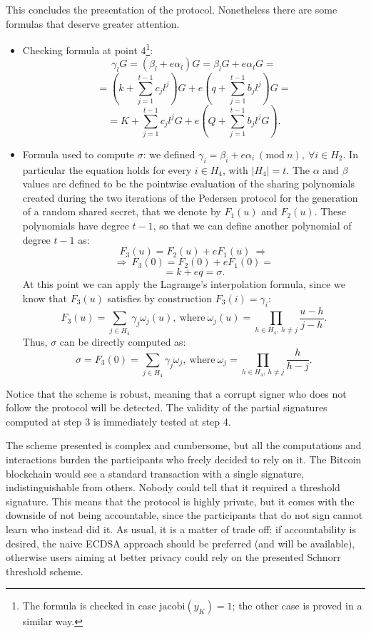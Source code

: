 This concludes the presentation of the protocol. Nonetheless there are some formulas that deserve greater attention.
\begin{itemize}
	\item Checking formula at point 4\footnote{The formula is checked in case $\text{jacobi}(y_K) = 1$; the other case is proved in a similar way.}: 
	$$\gamma_lG = (\beta_l + e\alpha_l)G = \beta_lG + e\alpha_lG = $$
	$$= \left(k + \sum_{j = 1}^{t - 1}c_jl^j\right)G + e\left(q + \sum_{j = 1}^{t - 1}b_jl^j\right)G =$$
	$$= K + \sum_{j = 1}^{t - 1}c_jl^jG + e\left(Q + \sum_{j = 1}^{t - 1}b_jl^jG\right).$$
	\item Formula used to compute $\sigma$: we defined $\gamma_i = \beta_i + e\alpha_i \ (\text{mod} \ n), \ \forall i \in H_2$. In particular the equation holds for every $i \in H_4$, with $|H_4| = t$. The $\alpha$ and $\beta$ values are defined to be the pointwise evaluation of the sharing polynomials created during the two iterations of the Pedersen protocol for the generation of a random shared secret, that we denote by $F_1(u)$ and $F_2(u)$. These polynomials have degree $t - 1$, so that we can define another polynomial of degree $t - 1$ as:
	$$F_3(u) = F_2(u) + eF_1(u) \ \Longrightarrow $$
	$$\Longrightarrow \ F_3(0) = F_2(0) + eF_1(0) = $$
	$$= k + eq = \sigma.$$
	At this point we can apply the Lagrange's interpolation formula, since we know that $F_3(u)$ satisfies by construction $F_3(i) = \gamma_i$:
	$$F_3(u) = \sum_{j \in H_4}\gamma_j\omega_j(u), \ \text{where} \ \omega_j(u) = \prod_{h \in H_4, \ h \neq j}\frac{u - h}{j -h}.$$
	Thus, $\sigma$ can be directly computed as:
	$$\sigma = F_3(0) = \sum_{j \in H_4}\gamma_j\omega_j, \ \text{where} \ \omega_j = \prod_{h \in H_4, \ h \neq j}\frac{h}{h - j}.$$
\end{itemize}
Notice that the scheme is robust, meaning that a corrupt signer who does not follow the protocol will be detected. The validity of the partial signatures computed at step 3 is immediately tested at step 4.

\bigskip

\bigskip
\noindent
The scheme presented is complex and cumbersome, but all the computations and interactions burden the participants who freely decided to rely on it. The Bitcoin blockchain would see a standard transaction with a single signature, indistinguishable from others. Nobody could tell that it required a threshold signature. This means that the protocol is highly private, but it comes with the downside of not being accountable, since the participants that do not sign cannot learn who instead did it. As usual, it is a matter of trade off: if accountability is desired, the naive ECDSA approach should be preferred (and will be available), otherwise users aiming at better privacy could rely on the presented Schnorr threshold scheme.

